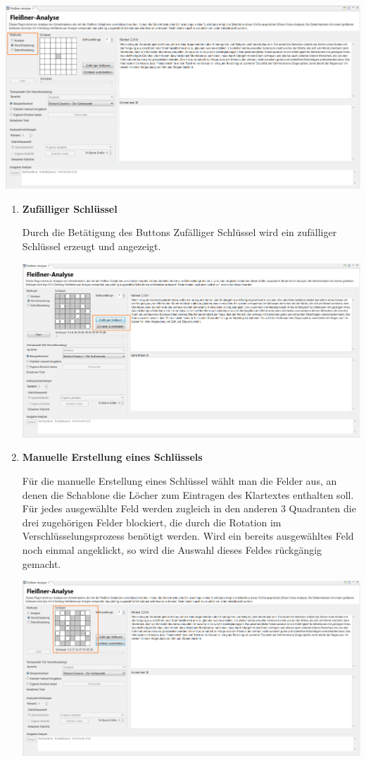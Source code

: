 \documentclass[fontsize=12pt, DIV=15, parskip=half-]{scrartcl}
\theoremstyle{break}
\begin{document}
\includegraphics[scale=0.45]{FleissnerEncryptSelection.png}



\begin{enumerate}[label=(\alph*), leftmargin=*]
\item \textbf{Zufälliger Schlüssel}

Durch die Betätigung des Buttons \glqq Zufälliger Schlüssel\grqq{} wird ein zufälliger Schlüssel erzeugt und angezeigt. 

\includegraphics[scale=0.4]{FleissnerEncryptRandomKey.png}

\item \textbf{Manuelle Erstellung eines Schlüssels}

Für die manuelle Erstellung eines Schlüssel wählt man die Felder aus, an denen die Schablone die Löcher zum Eintragen des Klartextes enthalten soll. Für jedes ausgewählte Feld werden zugleich in den anderen 3 Quadranten die drei zugehörigen Felder blockiert, die durch die Rotation im Verschlüsselungsprozess benötigt werden. Wird ein bereits ausgewähltes Feld noch einmal angeklickt, so wird die Auswahl dieses Feldes rückgängig gemacht. 

\includegraphics[scale=0.4]{FleissnerEncryptKeySelection.png}
\end{enumerate} 
\end{document}
